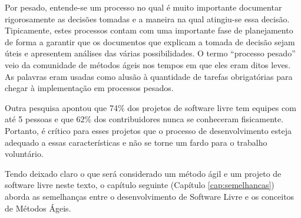 Por pesado, entende-se um processo no qual é muito importante
documentar rigorosamente as decisões tomadas e a maneira na qual
atingiu-se essa decisão. Tipicamente, estes processos contam com uma
importante fase de planejamento de forma a garantir que os documentos
que explicam a tomada de decisão sejam úteis e apresentem análises das
várias possibilidades. O termo ``processo pesado'' veio da comunidade
de métodos ágeis nos tempos em que eles eram ditos leves. As palavras
eram usadas como alusão à quantidade de tarefas obrigatórias para
chegar à implementação em processos pesados.

Outra pesquisa \cite{Reis2003} apontou que 74\% dos projetos de
software livre tem equipes com até 5 pessoas e que 62\% dos
contribuidores nunca se conheceram fisicamente. Portanto, é crítico
para esses projetos que o processo de desenvolvimento esteja adequado
a essas características e não se torne um fardo para o trabalho
voluntário.

Tendo deixado claro o que será considerado um método ágil e um projeto
de software livre neste texto, o capítulo seguinte (Capítulo
\ref{cap:semelhancas}) aborda as semelhanças entre o desenvolvimento
de Software Livre e os conceitos de Métodos Ágeis.
